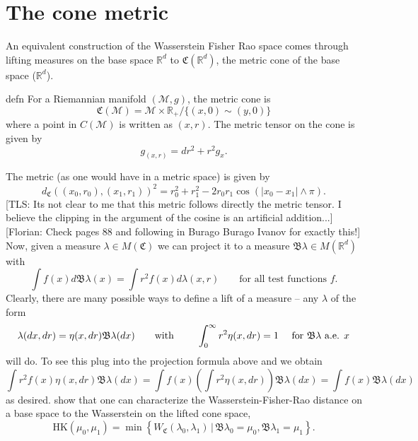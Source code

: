 \documentclass{article}
\newcommand{\man}{\mathcal{M}}
\newcommand{\ndfg}[1]{{\color{magenta}[Florian: #1]}}
\newcommand{\tls}[1]{{\color{cyan}[TLS: #1]}}
\begin{document}
\section{The cone metric}
An equivalent construction of the Wasserstein Fisher Rao space comes through lifting measures on the base space $\mathbb{R}^d$ to $\mathfrak{C}(\mathbb{R}^d)$, the metric cone of the base space ($\mathbb{R}^d$). 
\begin{restatable}{defn}{}
    For a Riemannian manifold $(\man, g)$, the metric cone is
    \[\mathfrak{C}(\man) = \man \times \mathbb{R}_{+} / \{(x, 0) \sim (y, 0)\}\]
    where a point in $C(\man)$ is written as $(x, r)$. The metric tensor on the cone is given by
    \[g_{(x,r)} = dr^2 + r^2g_x.\]
\end{restatable} 
The metric (as one would have in a metric space) is given by
\begin{equation}
    d_{\mathfrak{C}}((x_0, r_0), (x_1, r_1))^2 = r_0^2 + r_1^2 - 2r_0r_1\cos(|x_0 - x_1| \land \pi).
\end{equation}
\tls{Its not clear to me that this metric follows directly the metric tensor. I believe the clipping in the argument of the cosine is an artificial addition...} \ndfg{Check pages 88 and following in Burago Burago Ivanov for exactly this!} Now, given a measure $\lambda \in M(\mathfrak{C})$ we can project it to a measure $\mathfrak{B}\lambda \in M(\mathbb{R}^d)$ with
\begin{equation}
    \int f(x)d\mathfrak{B}\lambda(x) = \int r^2 f(x) d\lambda(x, r) \qquad \text{for all test functions }f.
\end{equation}
Clearly, there are many possible ways to define a lift of a measure -- any $\lambda$ of the form
\begin{equation}
    \lambda(dx, dr) = \eta(x, dr)\mathfrak{B}\lambda(dx) \qquad \text{with } \qquad \int_0^\infty r^2\eta(x, dr) = 1 \text{ \quad for $\mathfrak{B}\lambda$ a.e. $x$}
\end{equation}
will do. To see this plug into the projection formula above and we obtain
\[\int r^2 f(x)\eta(x, dr)\mathfrak{B}\lambda(dx) = \int f(x) \left(\int r^2 \eta(x, dr) \right) \mathfrak{B}\lambda(dx) = \int f(x) \mathfrak{B}\lambda(dx) \]
as desired. \citet{liero2016optimal} show that one can characterize the Wasserstein-Fisher-Rao distance on a base space to the Wasserstein on the lifted cone space,
\begin{equation} \label{eq: cone wasserstein and hk equivalence}
    \text{HK}(\mu_0, \mu_1) = \min\left\{W_{\mathfrak{C}}(\lambda_0, \lambda_1) \,\Big|\, \mathfrak{B}\lambda_0 = \mu_0, \mathfrak{B}\lambda_1 = \mu_1\right\}.
\end{equation}
\end{document}
